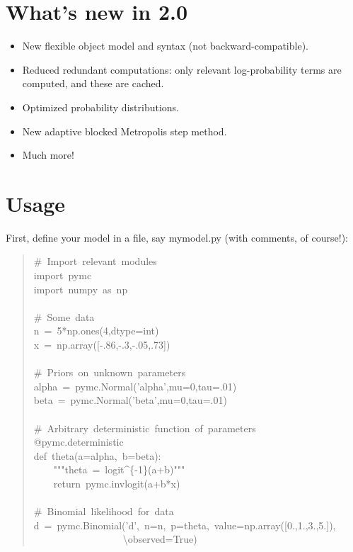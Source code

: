 
\hypertarget{what-s-new-in-2-0}{}
\section{What's new in 2.0}
\label{what-s-new-in-2-0}
\begin{itemize}
\item {}
New flexible object model and syntax (not backward-compatible).

\item {}
Reduced redundant computations: only relevant log-probability terms are
computed, and these are cached.

\item {}
Optimized probability distributions.

\item {}
New adaptive blocked Metropolis step method.

\item {}
Much more!

\end{itemize}



\hypertarget{usage}{}
\section{Usage}
\label{usage}

First, define your model in a file, say mymodel.py (with comments, of course!):
\begin{quote}{\ttfamily \raggedright \noindent
{\#}~Import~relevant~modules~\\
import~pymc~\\
import~numpy~as~np~\\
~\\
{\#}~Some~data~\\
n~=~5*np.ones(4,dtype=int)~\\
x~=~np.array({[}-.86,-.3,-.05,.73{]})~\\
~\\
{\#}~Priors~on~unknown~parameters~\\
alpha~=~pymc.Normal('alpha',mu=0,tau=.01)~\\
beta~=~pymc.Normal('beta',mu=0,tau=.01)~\\
~\\
{\#}~Arbitrary~deterministic~function~of~parameters~\\
@pymc.deterministic~\\
def~theta(a=alpha,~b=beta):~\\
~~~~"{}"{}"theta~=~logit{\textasciicircum}{\{}-1{\}}(a+b)"{}"{}"~\\
~~~~return~pymc.invlogit(a+b*x)~\\
~\\
{\#}~Binomial~likelihood~for~data~\\
d~=~pymc.Binomial('d',~n=n,~p=theta,~value=np.array({[}0.,1.,3.,5.{]}),~\\
~~~~~~~~~~~~~~~~~~{\textbackslash}observed=True)
}\end{quote}

